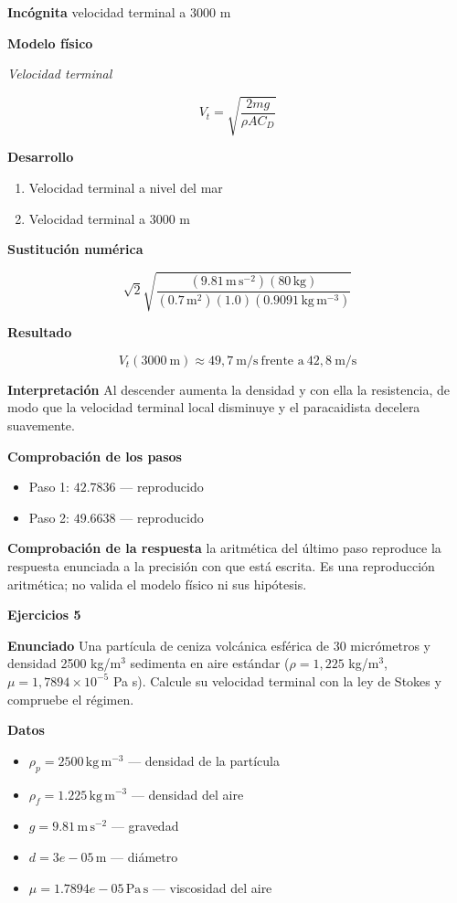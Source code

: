 \documentclass[10pt,openany]{book}
\begin{document}
\noindent\textbf{Incógnita}
velocidad terminal a 3000 m

\noindent\textbf{Modelo físico}

\noindent\textit{Velocidad terminal}

\[
V_t = \sqrt{\frac{2 m g}{\rho A C_D}}
\]

\noindent\textbf{Desarrollo}
\begin{enumerate}
\item
Velocidad terminal a nivel del mar
\item
Velocidad terminal a 3000 m
\end{enumerate}

\noindent\textbf{Sustitución numérica}

\[
\sqrt{2} \sqrt{\frac{\left(9.81\,\mathrm{m}\,\mathrm{s}^{-2}\right) \left(80\,\mathrm{kg}\right)}{\left(0.7\,\mathrm{m}^{2}\right) \left(1.0\right) \left(0.9091\,\mathrm{kg}\,\mathrm{m}^{-3}\right)}}
\]

\noindent\textbf{Resultado}

\[
V_t(3000\ \mathrm{m}) \approx 49{,}7\ \mathrm{m/s}\ \text{frente a}\ 42{,}8\ \mathrm{m/s}
\]

\noindent\textbf{Interpretación}
Al descender aumenta la densidad y con ella la resistencia, de modo que la velocidad terminal local disminuye y el paracaidista decelera suavemente.

\noindent\textbf{Comprobación de los pasos}
\begin{itemize}
\item Paso 1: $42.7836$ — reproducido
\item Paso 2: $49.6638$ — reproducido
\end{itemize}

\noindent\textbf{Comprobación de la respuesta} la aritmética del último paso reproduce la respuesta enunciada a la precisión con que está escrita. Es una reproducción aritmética; no valida el modelo físico ni sus hipótesis.

\noindent\textbf{Ejercicios 5}

\noindent\textbf{Enunciado}
Una partícula de ceniza volcánica esférica de 30 micrómetros y densidad 2500 kg/m\(^3\) sedimenta en aire estándar (\(\rho = 1{,}225\) kg/m\(^3\), \(\mu = 1{,}7894\times 10^{-5}\) Pa s). Calcule su velocidad terminal con la ley de Stokes y compruebe el régimen.

\noindent\textbf{Datos}
\begin{itemize}
\item $\rho_{p} = 2500\,\mathrm{kg}\,\mathrm{m}^{-3}$ — densidad de la partícula
\item $\rho_{f} = 1.225\,\mathrm{kg}\,\mathrm{m}^{-3}$ — densidad del aire
\item $g = 9.81\,\mathrm{m}\,\mathrm{s}^{-2}$ — gravedad
\item $d = 3e-05\,\mathrm{m}$ — diámetro
\item $\mu = 1.7894e-05\,\mathrm{Pa}\,\mathrm{s}$ — viscosidad del aire
\end{itemize}
\end{document}
